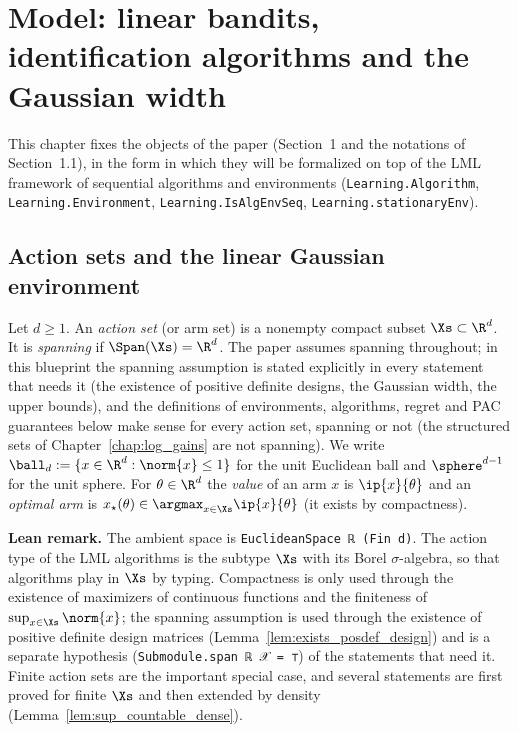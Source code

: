 \chapter{Model: linear bandits, identification algorithms and the Gaussian width}
\label{chap:model}

This chapter fixes the objects of the paper (Section~1 and the notations of Section~1.1),
in the form in which they will be formalized on top of the LML framework of sequential
algorithms and environments (\texttt{Learning.Algorithm}, \texttt{Learning.Environment},
\texttt{Learning.IsAlgEnvSeq}, \texttt{Learning.stationaryEnv}).

\section{Action sets and the linear Gaussian environment}
\label{sec:model_env}

\begin{definition}\label{def:arm_set}
\leanok
Let $d \ge 1$. An \emph{action set} (or arm set) is a nonempty compact subset $\Xs \subset \R^d$.
It is \emph{spanning} if $\Span(\Xs) = \R^d$. The paper assumes spanning throughout; in this
blueprint the spanning assumption is stated explicitly in every statement that needs it (the
existence of positive definite designs, the Gaussian width, the upper bounds), and the
definitions of environments, algorithms, regret and PAC guarantees below make sense for every
action set, spanning or not (the structured sets of Chapter~\ref{chap:log_gains} are not
spanning). We write $\ball_d := \{x \in \R^d : \norm{x} \le 1\}$ for the unit
Euclidean ball and $\sphere^{d-1}$ for the unit sphere. For $\theta \in \R^d$ the
\emph{value} of an arm $x$ is $\ip{x}{\theta}$ and an \emph{optimal arm} is
$x_\star(\theta) \in \argmax_{x \in \Xs} \ip{x}{\theta}$ (it exists by compactness).
\end{definition}

\textbf{Lean remark.} The ambient space is \texttt{EuclideanSpace ℝ (Fin d)}. The action
type of the LML algorithms is the subtype $\Xs$ with its Borel $\sigma$-algebra, so that
algorithms play in $\Xs$ by typing. Compactness is only used through the existence of
maximizers of continuous functions and the finiteness of $\sup_{x \in \Xs}\norm{x}$; the
spanning assumption is used through the existence of positive definite design matrices
(Lemma~\ref{lem:exists_posdef_design}) and is a separate hypothesis
(\texttt{Submodule.span ℝ 𝒳 = ⊤}) of the statements that need it. Finite action sets are the important special case,
and several statements are first proved for finite $\Xs$ and then extended by density
(Lemma~\ref{lem:sup_countable_dense}).

